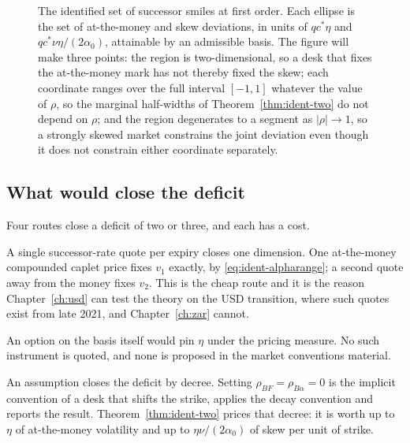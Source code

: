 \documentclass[../../../main.tex]{subfiles}
\begin{document}
\begin{figure}[htbp]
\centering
{}
\caption{The identified set of successor smiles at first order. Each ellipse is the set of at-the-money and skew deviations, in units of $qc^*\eta$ and $qc^*\nu\eta/(2\alpha_0)$, attainable by an admissible basis. The figure will make three points: the region is two-dimensional, so a desk that fixes the at-the-money mark has not thereby fixed the skew; each coordinate ranges over the full interval $[-1,1]$ whatever the value of $\rho$, so the marginal half-widths of Theorem~\ref{thm:ident-two} do not depend on $\rho$; and the region degenerates to a segment as $|\rho|\to1$, so a strongly skewed market constrains the joint deviation even though it does not constrain either coordinate separately.\label{fig:ident-region}}
\end{figure}

\subsection{What would close the deficit}

Four routes close a deficit of two or three, and each has a cost.

A single successor-rate quote per expiry closes one dimension. One at-the-money compounded caplet price fixes $v_1$ exactly, by \eqref{eq:ident-alpharange}; a second quote away from the money fixes $v_2$. This is the cheap route and it is the reason Chapter~\ref{ch:usd} can test the theory on the USD transition, where such quotes exist from late 2021, and Chapter~\ref{ch:zar} cannot.

An option on the basis itself would pin $\eta$ under the pricing measure. No such instrument is quoted, and none is proposed in the market conventions material.

An assumption closes the deficit by decree. Setting $\rho_{BF}=\rho_{B\alpha}=0$ is the implicit convention of a desk that shifts the strike, applies the decay convention and reports the result. Theorem~\ref{thm:ident-two} prices that decree: it is worth up to $\eta$ of at-the-money volatility and up to $\eta\nu/(2\alpha_0)$ of skew per unit of strike.
\end{document}
